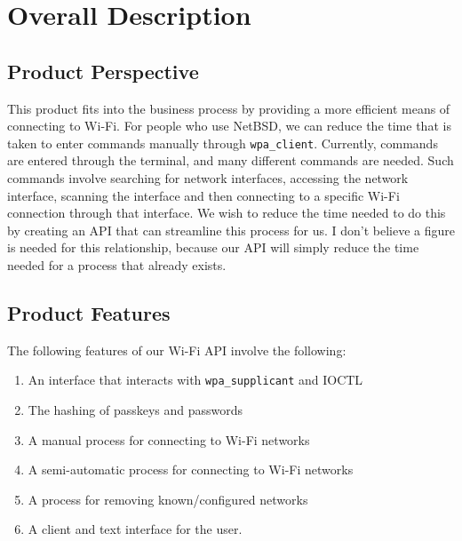 \section{Overall Description}
%

\subsection{Product Perspective}

This product fits into the business process by providing a more efficient means of connecting 
to Wi-Fi. For people who use NetBSD, we can reduce the time that is taken to enter commands manually 
through \texttt{wpa\_client}. Currently, commands are entered through the terminal, and many different 
commands are needed. Such commands involve searching for network interfaces, accessing the network 
interface, scanning the interface and then connecting to a specific Wi-Fi connection through that 
interface. We wish to reduce the time needed to do this by creating an API that can streamline this 
process for us. I don’t believe a figure is needed for this relationship, because our API will simply 
reduce the time needed for a process that already exists. 

\subsection{Product Features}

The following features of our Wi-Fi API involve the following: 

\begin{enumerate}
\item An interface that interacts with \texttt{wpa\_supplicant} and IOCTL 
\item The hashing of passkeys and passwords 
\item A manual process for connecting to Wi-Fi networks 
\item A semi-automatic process for connecting to Wi-Fi networks 
\item A process for removing known/configured networks 
\item A client and text interface for the user. 
\end{enumerate} 

